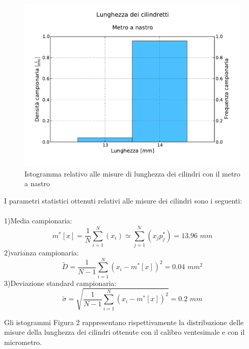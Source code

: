 \documentclass[12pt, twoside, a4paper]{article}
\begin{document}
\begin{figure}[bht]
	\centering
	\includegraphics[width=130mm]{Cilindretti_metro.pdf}
	\caption{Istogramma relativo alle misure di lunghezza dei cilindri con il metro a nastro}
\end{figure}

I parametri statistici ottenuti relativi alle misure dei cilindri sono i seguenti:\\
\\
1)Media campionaria:
\begin{equation}
m^*[x] = \frac{1}{N} \sum_{i=1}^{N} (x_i) \simeq \sum_{j=1}^{\mathcal{N}} (x_j p_j^*) = 13.96\,\,mm 
\end{equation}
2)varianza campionaria:
\begin{equation}
\tilde{D} = \frac{1}{N - 1} \sum_{i=1}^{N} (x_i - m^*[x])^2 = 0.04\,\,mm^2
\end{equation}
3)Deviazione standard campionaria:
\begin{equation}
\tilde{\sigma} = \sqrt{\frac{1}{N - 1} \sum_{i=1}^{N} (x_i - m^*[x])^2} = 0.2\,\,mm
\end{equation}

Gli istogrammi Figura 2 rappresentano rispettivamente la distribuzione delle misure della lunghezza dei cilindri ottenute con il calibro ventesimale e con il micrometro.
\end{document}

